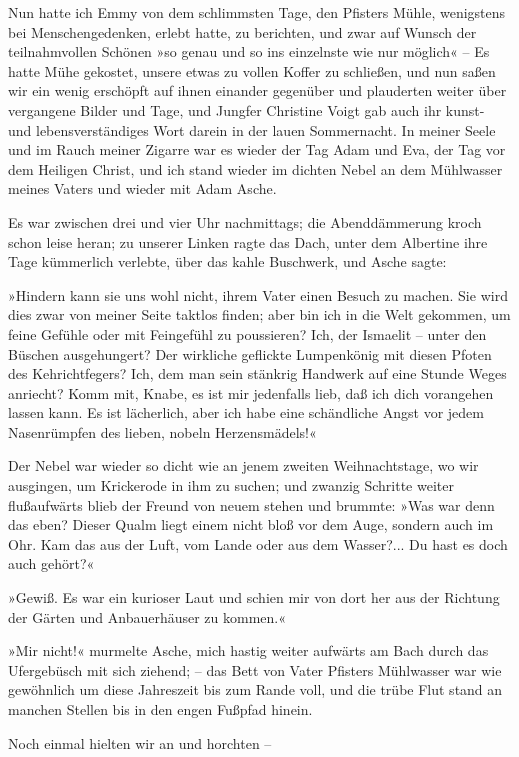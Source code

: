 Nun hatte ich Emmy von dem schlimmsten Tage, den Pfisters Mühle,
wenigstens bei Menschengedenken, erlebt hatte, zu berichten, und
zwar auf Wunsch der teilnahmvollen Schönen »so genau und so ins
einzelnste wie nur möglich« – Es hatte Mühe gekostet, unsere etwas
zu vollen Koffer zu schließen, und nun saßen wir ein wenig
erschöpft auf ihnen einander gegenüber und plauderten weiter über
vergangene Bilder und Tage, und Jungfer Christine Voigt gab auch
ihr kunst- und lebensverständiges Wort darein in der lauen
Sommernacht. In meiner Seele und im Rauch meiner Zigarre war es
wieder der Tag Adam und Eva, der Tag vor dem Heiligen Christ, und
ich stand wieder im dichten Nebel an dem Mühlwasser meines Vaters
und wieder mit Adam Asche.

Es war zwischen drei und vier Uhr nachmittags; die Abenddämmerung
kroch schon leise heran; zu unserer Linken ragte das Dach, unter
dem Albertine ihre Tage kümmerlich verlebte, über das kahle
Buschwerk, und Asche sagte:

»Hindern kann sie uns wohl nicht, ihrem Vater einen Besuch zu
machen. Sie wird dies zwar von meiner Seite taktlos finden; aber
bin ich in die Welt gekommen, um feine Gefühle oder mit Feingefühl
zu poussieren? Ich, der Ismaelit – unter den Büschen ausgehungert?
Der wirkliche geflickte Lumpenkönig mit diesen Pfoten des
Kehrichtfegers? Ich, dem man sein stänkrig Handwerk auf eine Stunde
Weges anriecht? Komm mit, Knabe, es ist mir jedenfalls lieb, daß
ich dich vorangehen lassen kann. Es ist lächerlich, aber ich habe
eine schändliche Angst vor jedem Nasenrümpfen des lieben, nobeln
Herzensmädels!«

Der Nebel war wieder so dicht wie an jenem zweiten Weihnachtstage,
wo wir ausgingen, um Krickerode in ihm zu suchen; und zwanzig
Schritte weiter flußaufwärts blieb der Freund von neuem stehen und
brummte: »Was war denn das eben? Dieser Qualm liegt einem nicht
bloß vor dem Auge, sondern auch im Ohr. Kam das aus der Luft, vom
Lande oder aus dem Wasser?... Du hast es doch auch gehört?«

»Gewiß. Es war ein kurioser Laut und schien mir von dort her aus
der Richtung der Gärten und Anbauerhäuser zu kommen.«

»Mir nicht!« murmelte Asche, mich hastig weiter aufwärts am Bach
durch das Ufergebüsch mit sich ziehend; – das Bett von Vater
Pfisters Mühlwasser war wie gewöhnlich um diese Jahreszeit bis zum
Rande voll, und die trübe Flut stand an manchen Stellen bis in den
engen Fußpfad hinein.

Noch einmal hielten wir an und horchten –


